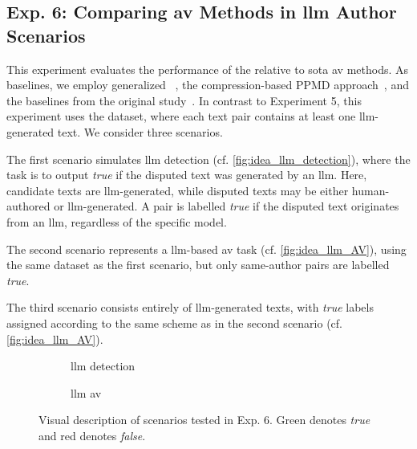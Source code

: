 \subsection{Exp. 6: Comparing \acs{av} Methods in \acs{llm} Author Scenarios}

This experiment evaluates the performance of the \impAppr{} relative to \acl{sota} \ac{av} methods. 
As baselines, we employ generalized \unmasking{}~\citep{bevendorff_generalizing_2019}, the compression-based PPMD approach~\citep{stamatatos_survey_2009}, and the baselines from the original \impAppr{} study~\citep{koppel_determining_2014}. 
In contrast to Experiment 5, this experiment uses the \dataArtificialStudent{} dataset, where each text pair contains at least one \ac{llm}-generated text. 
We consider three scenarios. 

The first scenario simulates \ac{llm} detection (cf. \autoref{fig:idea_llm_detection}), where the task is to output \textit{true} if the disputed text was generated by an \ac{llm}. 
Here, candidate texts are \ac{llm}-generated, while disputed texts may be either human-authored or \ac{llm}-generated. 
A pair is labelled \textit{true} if the disputed text originates from an \ac{llm}, regardless of the specific model. 

The second scenario represents a \ac{llm}-based \ac{av} task (cf. \autoref{fig:idea_llm_AV}), using the same dataset as the first scenario, but only same-author pairs are labelled \textit{true}. 

The third scenario consists entirely of \ac{llm}-generated texts, with \textit{true} labels assigned according to the same scheme as in the second scenario (cf. \autoref{fig:idea_llm_AV}). 

\begin{figure}[htbp]
  \centering
  \begin{subfigure}{0.45\textwidth}
    \centering
    
    \caption{\ac{llm} detection}
    \label{fig:idea_llm_detection}
  \end{subfigure}
  \hfill
  \begin{subfigure}{0.45\textwidth}
    \centering
    
    \caption{\ac{llm} \ac{av}}
    \label{fig:idea_llm_AV}
  \end{subfigure}
  \caption{Visual description of scenarios tested in Exp. 6.
  Green denotes \textit{true} and red denotes \textit{false}.
  }
  \label{fig:ideas_exp6}
\end{figure}

